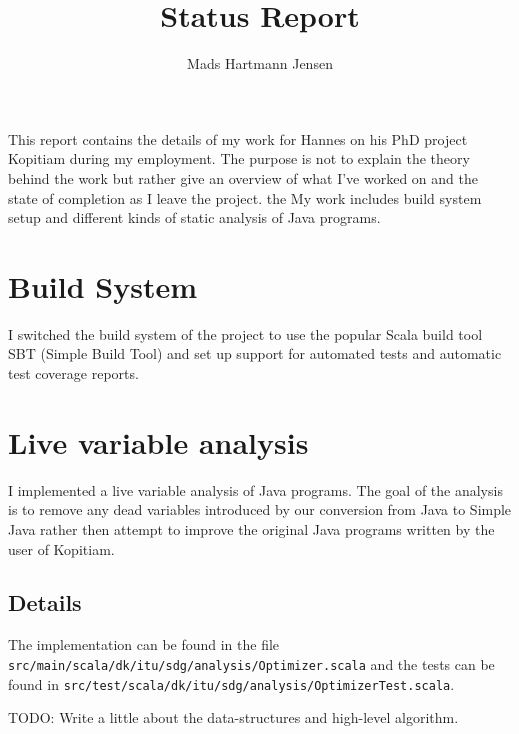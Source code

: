 \documentclass[11pt]{exam}
\title{Status Report}
\author{Mads Hartmann Jensen}
\begin{document}
\maketitle{}

\paragraph{} This report contains the details of my work for Hannes on his PhD project Kopitiam during my employment. The purpose is not to explain the theory behind the work but rather give an overview of what I've worked on and the state of completion as I leave the project. the My work includes build system setup and different kinds of static analysis of Java programs. \newline \newline

\newpage

\tableofcontents

\newpage

\section{Build System}

I switched the build system of the project to use the popular Scala build tool SBT (Simple Build Tool) and set up support for automated tests and automatic test coverage reports.

\section{Live variable analysis}

I implemented a live variable analysis of Java programs. The goal of the analysis is to remove any dead variables introduced by our conversion from Java to Simple Java rather then attempt to improve the original Java programs written by the user of Kopitiam.

\subsection{Details}

The implementation can be found in the file \texttt{src/main/scala/dk/itu/sdg/analysis/Optimizer.scala} and the tests can be found in \texttt{src/test/scala/dk/itu/sdg/analysis/OptimizerTest.scala}. \newline

TODO: Write a little about the data-structures and high-level algorithm.
\end{document}
